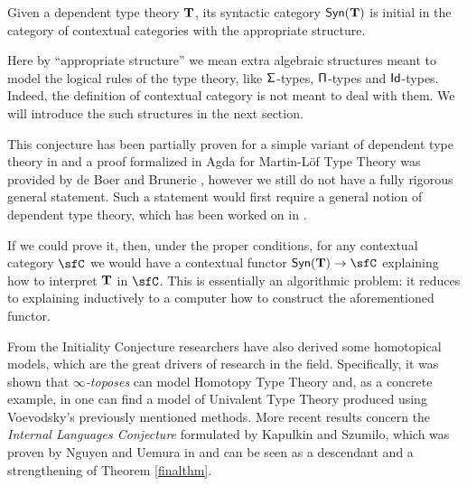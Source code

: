 \begin{named}[Initiality]\label{initconj}
  Given a dependent type theory $\operatorname{\mathbf{T}}$, its syntactic category $\mathsf{Syn}(\mathbf{\operatorname{\mathbf{T}}})$ is
  initial in the category of contextual categories with the appropriate
  structure.
\end{named}

\begin{rmk}
Here by ``appropriate structure'' we mean extra algebraic structures meant to
model the
logical rules of the type theory, like $\operatorname{\mathsf{\Sigma}}$-types, $\operatorname{\mathsf{\Pi}}$-types and
$\operatorname{\mathsf{Id}}$-types. Indeed, the definition of contextual category is not meant to deal
with them. We will introduce the such structures in the next section.
\end{rmk}

\begin{rmk}
This conjecture has been partially proven for a simple variant of dependent type
theory in \cite{Str91} and a proof formalized in Agda
for Martin-L\"{o}f Type Theory was provided by de Boer and Brunerie
\cite{Boe20}, however we still do not have a fully
rigorous general statement. Such a statement would first require a general
notion of dependent type theory,
which has been worked on in \cite{Isa17, Uem19, Bru20, BHL20, NU22}. 
\end{rmk}

If we could prove it, then, under the proper conditions,
for any contextual category $\sfC$ we would have a
contextual functor $\Syn{\T}\rightarrow\sfC$ explaining how to interpret $\operatorname{\mathbf{T}}$ in
$\sfC$. This is essentially an algorithmic problem: it reduces to explaining
inductively to a computer how to construct the aforementioned functor.

\begin{rmk}\label{internal}
  From the Initiality Conjecture researchers have also derived some homotopical
  models, which are the great drivers
  of research in the field. Specifically, it was shown
  that \emph{$\infty$-toposes} can model Homotopy Type Theory \cite{Shu19} and,
  as a concrete example, in \cite{KL12}
  one can find a model of Univalent Type Theory produced using Voevodsky's
  previously mentioned methods. More recent results concern the \emph{Internal
  Languages Conjecture} \cite{KS19} formulated by Kapulkin and Szumilo, which
  was proven by Nguyen and Uemura in \cite{NU22} and can be seen as a
  descendant and a strengthening of Theorem \ref{finalthm}.
\end{rmk}

